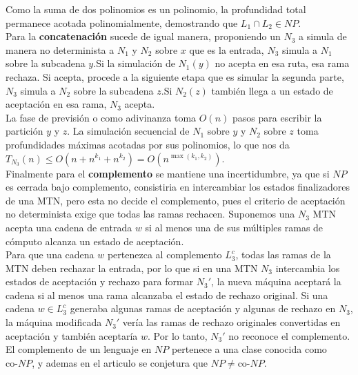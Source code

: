  Como la suma de dos polinomios es un polinomio, la profundidad total permanece acotada polinomialmente, demostrando que $L_1 \cap L_2 \in NP$.\\

Para la \textbf{concatenación} sucede de igual manera, proponiendo un $N_3$ a simula de manera no determinista a $N_1$ y $N_2$ sobre $x$ que es la entrada, $N_3$ simula a $N_1$ sobre la subcadena $y$.Si la simulación de $N_1(y)$ no acepta en esa ruta, esa rama rechaza. Si acepta, procede a la siguiente etapa que es simular la segunda parte, $N_3$ simula a $N_2$ sobre la subcadena $z$.Si $N_2(z)$ también llega a un estado de aceptación en esa rama, $N_3$ acepta.\\

La fase de previsión o como adivinanza toma $O(n)$ pasos para escribir la partición $y$ y $z$. La simulación secuencial de $N_1$ sobre $y$ y $N_2$ sobre $z$ toma profundidades máximas acotadas por sus polinomios, lo que nos da $T_{N_3}(n) \leq O(n + n^{k_1} + n^{k_2}) = O(n^{\max(k_1, k_2)})$.\\

Finalmente para el \textbf{complemento} se mantiene una incertidumbre, ya que si $NP$ es cerrada bajo complemento, consistiria en intercambiar los estados finalizadores de una MTN, pero esta no decide el complemento, pues el criterio de aceptación no determinista exige que todas las ramas rechacen. Suponemos una $N_3$ MTN acepta una cadena de entrada $w$ si al menos una de sus múltiples ramas de cómputo alcanza un estado de aceptación.\\

Para que una cadena $w$ pertenezca al complemento $L_3^c$, todas las ramas de la MTN deben rechazar la entrada, por lo que si en una MTN $N_3$ intercambia los estados de aceptación y rechazo para formar $N_3'$, la nueva máquina aceptará la cadena si al menos una rama alcanzaba el estado de rechazo original. Si una cadena $w \in L_3^c$ generaba algunas ramas de aceptación y algunas de rechazo en $N_3$, la máquina modificada $N_3'$ vería las ramas de rechazo originales convertidas en aceptación y también aceptaría $w$. Por lo tanto, $N_3'$ no reconoce el complemento.\\

El complemento de un lenguaje en $NP$ pertenece a una clase conocida como $\text{co-}NP$, y ademas en el articulo \cite{dejesse2025critique} se conjetura que $NP \neq \text{co-}NP$.\cite{dejesse2025critique}\\
